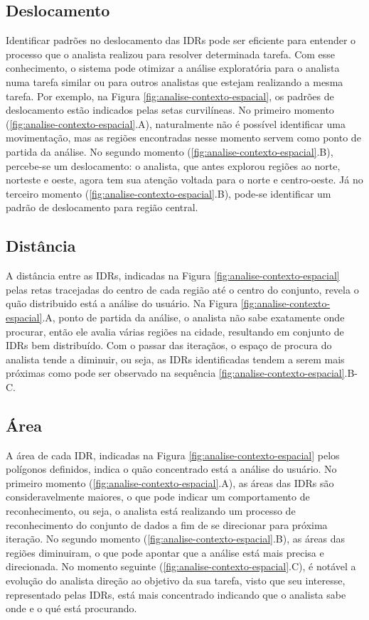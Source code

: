 \subsection{Deslocamento}

Identificar padrões no deslocamento das IDRs pode ser eficiente para entender o processo que o analista realizou para resolver determinada tarefa. Com esse conhecimento, o sistema pode otimizar a análise exploratória para o analista numa tarefa similar ou para outros analistas que estejam realizando a mesma tarefa. Por exemplo, na Figura \ref{fig:analise-contexto-espacial}, os padrões de deslocamento estão indicados pelas setas curvilíneas. No primeiro momento (\ref{fig:analise-contexto-espacial}.A), naturalmente não é possível identificar uma movimentação, mas as regiões encontradas nesse momento servem como ponto de partida da análise. No segundo momento (\ref{fig:analise-contexto-espacial}.B), percebe-se um deslocamento: o analista, que antes explorou regiões ao norte, norteste e oeste, agora tem sua atenção voltada para o norte e centro-oeste. Já no terceiro momento (\ref{fig:analise-contexto-espacial}.B), pode-se identificar um padrão de deslocamento para região central.

\subsection{Distância}

A distância entre as IDRs, indicadas na Figura \ref{fig:analise-contexto-espacial} pelas retas tracejadas do centro de cada região até o centro do conjunto, revela o quão distribuido está a análise do usuário. Na Figura \ref{fig:analise-contexto-espacial}.A, ponto de partida da análise, o analista não sabe exatamente onde procurar, então ele avalia várias regiões na cidade, resultando em conjunto de IDRs bem distribuído. Com o passar das iteraçãos, o espaço de procura do analista tende a diminuir, ou seja, as IDRs identificadas tendem a serem mais próximas como pode ser observado na sequência \ref{fig:analise-contexto-espacial}.B-C.

\subsection{Área}

A área de cada IDR, indicadas na Figura \ref{fig:analise-contexto-espacial} pelos polígonos definidos, indica o quão concentrado está a análise do usuário. No primeiro momento (\ref{fig:analise-contexto-espacial}.A), as áreas das IDRs são consideravelmente maiores, o que pode indicar um comportamento de reconhecimento, ou seja, o analista está realizando um processo de reconhecimento do conjunto de dados a fim de se direcionar para próxima iteração. No segundo momento (\ref{fig:analise-contexto-espacial}.B), as áreas das regiões diminuiram, o que pode apontar que a análise está mais precisa e direcionada. No momento seguinte (\ref{fig:analise-contexto-espacial}.C), é notável a evolução do analista direção ao objetivo da sua tarefa, visto que seu interesse, representado pelas IDRs, está mais concentrado indicando que o analista sabe onde e o qué está procurando.

